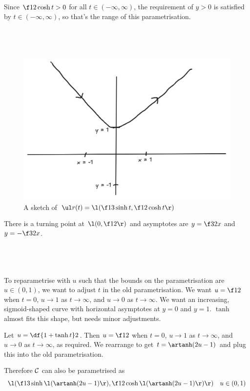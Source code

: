 \documentclass[a4paper]{article}
\begin{document}
Since $\f12 \cosh t > 0$ for all $t \in (-\infty, \infty)$, the requirement of $y>0$ is satisfied by $t \in (-\infty, \infty)$, so that's the range of this parametrisation.

\subsection{~}

\begin{figure}[h]
	\centering
	\includegraphics[scale=0.3]{Q2b}
	\caption{A sketch of $\ul r(t) = \l( \f13 \sinh t, \f12 \cosh t \r)$}
\end{figure}

There is a turning point at $\l(0, \f12\r)$ and asymptotes are $y = \f32 x$ and $y = -\f32 x$.

\subsection{~}

To reparametrise with $u$ such that the bounds on the parametrisation are $u \in (0, 1)$, we want to adjust $t$ in the old parametrisation. We want $u = \f12$ when $t = 0$, $u \to 1$ as $t \to \infty$, and $u \to 0$ as $t \to \infty$. We want an increasing, sigmoid-shaped curve with horizontal asymptotes at $y=0$ and $y=1$. $\tanh$ almost fits this shape, but needs minor adjustments.

Let $u = \df{1 + \tanh t}2$. Then $u = \f12$ when $t = 0$, $u \to 1$ as $t \to \infty$, and $u \to 0$ as $t \to \infty$, as required. We rearrange to get $t = \artanh(2u - 1)$ and plug this into the old parametrisation.

Therefore $\cal C$ can also be parametrised as $$\l( \f13 \sinh\l(\artanh(2u - 1)\r), \f12 \cosh\l(\artanh(2u - 1)\r) \r) \quad u \in (0, 1)$$
\end{document}
